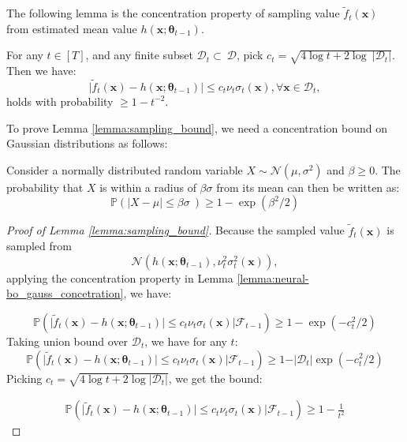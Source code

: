 The following lemma is the concentration property of sampling value $\widetilde{f}_t(\mathbf{x})$ from estimated mean value $h(\mathbf{x}; \boldsymbol{\theta}_{t-1})$.
\begin{lemma}
\label{lemma:sampling_bound}
For any $t \in [T]$, and any finite subset $\mathcal{D}_t \subset\ \mathcal{D}$,  pick $c_t =  \sqrt{4\log t + 2 \log \ \lvert \mathcal D_t \rvert}$. Then we have:  
\[\lvert \widetilde{f}_t(\mathbf{x}) - h(\mathbf{x}; \boldsymbol{\theta}_{t-1}) \rvert \leq c_t\nu_t \sigma_t(\mathbf{x}), \forall \mathbf{x} \in \mathcal{D}_t, \] 
holds with probability $\geq  1-t^{-2}$.
\end{lemma}

To prove Lemma \ref{lemma:sampling_bound}, we need a concentration bound on Gaussian distributions \citep{hoffman2013exploiting} as follows: 

\begin{sublemma}
\label{lemma:neural-bo_gauss_concetration}
Consider a normally distributed random variable $X \sim \mathcal{N}(\mu, \sigma^2)$ and $\beta \geq 0$. The probability that $X$ is within a radius of $\beta \sigma$ from its mean can then be written as:
\[ \mathbb{P}(\lvert X - \mu\rvert \leq \beta  \sigma\ ) \geq 1-\exp(\beta^2/2)\]
\end{sublemma}
\begin{proof}[Proof of Lemma \ref{lemma:sampling_bound}]
Because the sampled value $\widetilde{f}_t(\mathbf{x})$ is sampled from  
\[
\mathcal{N}(h(\mathbf{x}; \boldsymbol{\theta}_{t-1}), \nu_t^2\sigma_t^2(\mathbf{x})),
\] 
applying the concentration property in Lemma \ref{lemma:neural-bo_gauss_concetration}, we have:

\[\mathbb{P}(\rvert \widetilde{f}_t(\mathbf{x}) -h(\mathbf{x}; \boldsymbol{\theta}_{t-1}) \lvert \leq c_t \nu_t \sigma_t(\mathbf{x}) \lvert \mathcal{F}_{t-1}) \geq 1-\exp(-c_t^2/2)
\]
Taking union bound over $\mathcal{D}_t$, we have for any $t$:
\[\mathbb{P}(\rvert \widetilde{f}_t(\mathbf{x}) - h(\mathbf{x}; \boldsymbol{\theta}_{t-1}) \lvert \leq c_t \nu_t \sigma_t(\mathbf{x}) \lvert \mathcal{F}_{t-1}) \geq 1-\rvert \mathcal{D}_t \rvert\exp(-c_t^2/2) \]
Picking $c_t = \sqrt{4 \log t + 2 \log \lvert \mathcal{D}_t \rvert}$, we get the bound:

 \begin{align*}
     \mathbb{P}(\rvert \widetilde{f}_t(\mathbf{x}) - h(\mathbf{x}; \boldsymbol{\theta}_{t-1}) \lvert \leq c_t \nu_t \sigma_t(\mathbf{x}) \lvert \mathcal{F}_{t-1}) \geq 1-\frac{1}{t^2}
 \end{align*}
\end{proof}

